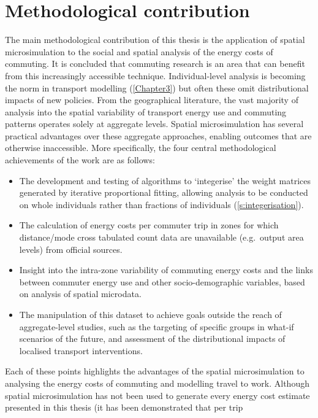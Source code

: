 \section{Methodological contribution} \label{smethcont}
The main methodological contribution of this thesis is the application of spatial
microsimulation to the social and spatial analysis of the energy costs of commuting.
It is concluded that commuting
research is an area that can benefit from this increasingly accessible
technique. Individual-level analysis is becoming the norm in
transport modelling (\cref{Chapter3}) but often these
omit distributional impacts of new policies.
From the geographical literature, the vast majority of analysis into the spatial variability
of transport energy use and commuting patterns operates solely at aggregate levels.
Spatial microsimulation has several practical advantages over these
aggregate approaches, enabling outcomes that are otherwise inaccessible.
More specifically, the four central methodological achievements of the
work are as follows:
\begin{itemize}
 \item The development and testing of algorithms to `integerise' the 
 weight matrices generated by iterative proportional fitting, allowing analysis
 to be conducted on whole individuals rather than fractions of individuals
(\cref{s:integerisation}).
 \item The calculation of energy costs per commuter trip in zones for which
distance/mode cross tabulated count data are unavailable (e.g.~output area levels)
from official sources.
 \item Insight into the intra-zone variability of commuting energy costs and
the links between commuter energy use and other socio-demographic variables,
based on analysis of spatial microdata.
\item The manipulation of this dataset to achieve goals outside the reach of
aggregate-level studies, such as the targeting of specific groups in what-if
scenarios of the future, and assessment of the distributional impacts of
localised transport interventions.
\end{itemize}
Each of these points highlights the advantages of the spatial microsimulation
to analysing the energy costs of commuting and modelling travel to work.
Although spatial microsimulation has not been used to generate every energy
cost estimate presented in this thesis (it has been demonstrated that per trip
